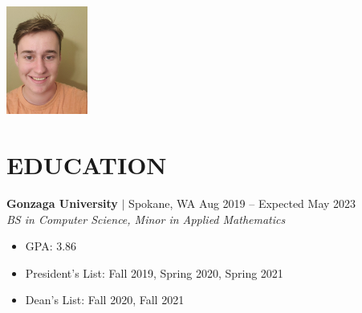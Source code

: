 \documentclass[11pt, a4paper, roman]{moderncv}
\newcommand{\education}[5]{
	\textbf{#1} $|$ #2
	\hfill#3
	\\\textit{#4}
	#5
	\vspace{2mm}
}
\begin{document}
\maketitle




%
\vspace*{-2cm}
\hspace*{15cm}
\includegraphics[width=0.2\textwidth, angle=-90, origin=c]{headshot.jpg}
\vspace*{-.5cm}
\section{EDUCATION}

\education{Gonzaga University}{Spokane, WA}{Aug 2019 -- Expected May 2023}{BS in Computer Science, Minor in Applied Mathematics}
	{\begin{itemize}
    		\item GPA: 3.86
    		\item President's List: Fall 2019, Spring 2020, Spring 2021
    		\item Dean's List: Fall 2020, Fall 2021
  		\end{itemize}
}
\end{document}
